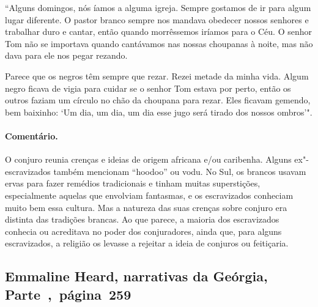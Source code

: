 ``Alguns domingos, nós íamos a alguma igreja. Sempre gostamos de ir para
algum lugar diferente. O pastor branco sempre nos mandava obedecer
nossos senhores e trabalhar duro e cantar, então quando morrêssemos
iríamos para o Céu. O senhor Tom não se importava quando cantávamos nas
nossas choupanas à noite, mas não dava para ele nos pegar rezando.

Parece que os negros têm sempre que rezar. Rezei metade da minha vida.
Algum negro ficava de vigia para cuidar se o senhor Tom estava por
perto, então os outros faziam um círculo no chão da choupana para rezar.
Eles ficavam gemendo, bem baixinho: `Um dia, um dia, um dia esse jugo
será tirado dos nossos ombros'".

\paragraph{Comentário.}\quad
{\small
O conjuro reunia crenças e ideias de origem africana e/ou
caribenha. Alguns ex"-escravizados também mencionam ``hoodoo'' ou vodu. No
Sul, os brancos usavam ervas para fazer remédios tradicionais e tinham
muitas superstições, especialmente aquelas que envolviam fantasmas, e os
escravizados conheciam muito bem essa cultura. Mas a natureza das suas
crenças sobre conjuro era distinta das tradições brancas. Ao que parece,
a maioria dos escravizados conhecia ou acreditava no poder dos conjuradores,
ainda que, para alguns escravizados, a religião os levasse a rejeitar a
ideia de conjuros ou feitiçaria.
}

\subsection{Emmaline Heard, narrativas da Geórgia, Parte~,~página~259}
\label{ref135}

